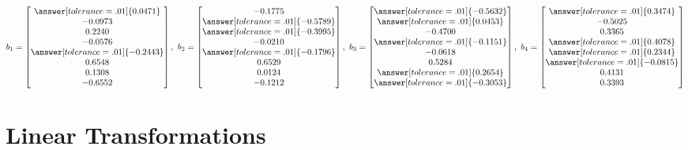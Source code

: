 \documentclass{ximera}
\begin{document}
\begin{example}
\begin{enumerate}
\[
b_1 = \begin{bmatrix} 
    \answer[tolerance=.01]{0.0471} \\ 
-0.0973 \\ 
0.2240 \\ 
-0.0576 \\ 
\answer[tolerance=.01]{-0.2443} \\ 
0.6548 \\ 
0.1308 \\ 
-0.6552 
\end{bmatrix}, \quad
b_2 = \begin{bmatrix} 
-0.1775 \\ 
\answer[tolerance=.01]{-0.5789} \\ 
\answer[tolerance=.01]{-0.3995} \\ 
-0.0210 \\ 
\answer[tolerance=.01]{-0.1796} \\ 
0.6529 \\ 
0.0124 \\ 
-0.1212 
\end{bmatrix}, \quad
b_3 = \begin{bmatrix} 
\answer[tolerance=.01]{-0.5632} \\ 
\answer[tolerance=.01]{0.0453} \\ 
-0.4700 \\ 
\answer[tolerance=.01]{-0.1151} \\ 
-0.0618 \\ 
0.5284 \\ 
\answer[tolerance=.01]{0.2654} \\ 
\answer[tolerance=.01]{-0.3053} 
\end{bmatrix}, \quad
b_4 = \begin{bmatrix} 
\answer[tolerance=.01]{0.3474} \\ 
-0.5025 \\ 
0.3365 \\ 
\answer[tolerance=.01]{0.4078} \\ 
\answer[tolerance=.01]{0.2344} \\ 
\answer[tolerance=.01]{-0.0815} \\ 
0.4131 \\ 
0.3393 
\end{bmatrix}
\]


\end{enumerate}

\end{example}



\section*{Linear Transformations}
\end{document}
